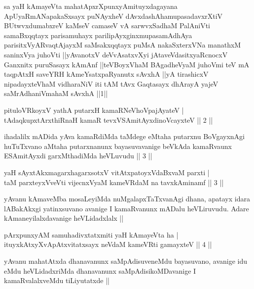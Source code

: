 \begin{shl}
sa yaH kAmayeVta mahatApxrXpunxyAmituyxdagayana ApUyaRmANapakaSxsayx puNAyxheV dAvxdashAhamupasadavxrXtiV BUtwvxdumabxreV kaMseV camaseV vA sarwvxSadhaM PalAniVti samaBxqqtayx parisamuhayx parilipAyxginxmupasamAdhAya parisitxVyARvaqtAjayxM saMsakxqqtayx puMsA nakaSxterxVNa manathxM saninxVya juhoVti ||yAvanotxV deVvAsatxvXyi jAtaveVdasitxyaRcnocxV Ganxnitx puruSasayx kAmAnf ||teVBoyxV\s haM BAgadheVyaM juhoVmi teV mA taqpAtxH saveYRH kAmeYsatxpaRyanutx sAvxhA ||yA tirashicxV nipadayxteV\s haM vidharaNiV iti tAM tAvx Gaqtasayx dhArayA yajeV saMrAdhaniVmahaM sAvxhA ||1||
\end{shl}


\begin{shl}
pituloVRkoyxV yathA putarxH kamaRNeVhoVpajAyateV | \\
tAdaqkupxtArxthiRnaH kamaR tevxVSAmitAyxdinoVcayxteV \hfill|| 2 || 
\end{shl}

\begin{artha}
ihadalilx mADida yAva kamaRdiMda taMdege eMtaha putarxnu BoVgayxnAgi huTuTxvano aMtaha putarxnanunx bayasuvavanige beVkAda kamaRvaunx ESAmitAyxdi garxMthadiMda heVLuvudu || 3 ||
\end{artha}


\begin{shl}
yaH sAyxtAkxmagarxhagarxsotxV vitAtxpatoyxVdaBxvaM parxti | \\
taM parxteyxVveVti vijecnxVyaM kameVRdaM na tavxkAminamf \hfill|| 3 || 
\end{shl}

\begin{artha}
yAvanu kAmaveMba mosaLeyiMda nuMgalapxTaTxvanAgi dhana, apatayx idara lABakAkxgi yatinxsuvano avanige I kamaRvanunx mADalu heVLiruvudu. Adare kAmaneyilalxdavanige heVLidadxlalx ||
\end{artha}


\begin{shl}
pArxpunxyAM samuhadivxtatxmiti yaH kAmayeVta ha | \\
ituyxkAtxyX\s vApAtxvitatxsayx neVdaM kameVRti gamayxteV \hfill|| 4 || 
\end{shl}

\begin{artha}
yAvanu mahatAtxda dhanavanunx saMpAdisuveneMdu bayasuvano, avanige idu eMdu heVLidadxriMda dhanavanunx saMpAdisikoMDavanige I kamaRvalalxveMdu tiLiyutatxde ||
\end{artha}

